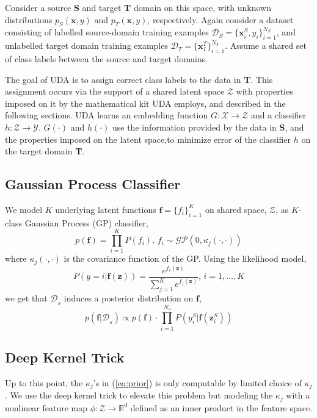 \documentclass[10pt,twocolumn,letterpaper]{article}
\newcommand{\vect}[1]{\boldsymbol{\mathbf{#1}}}
\begin{document}
Consider a source \textbf{S} and target \textbf{T} domain on this space,  with unknown distributions \(p_S(\vect{x}, y)\) and \(p_T(\vect{x},y)\), respectively.  Again consider a dataset consisting of 
labelled source-domain training examples \(\mathcal{D}_S = \{\vect{x}_i^S, y_i\}_{i=1}^{N_S}\), and unlabelled target domain training examples \(\mathcal{D}_T = \{\vect{x}_I^T\}_{i=1}^{N_T}\).  Assume a shared set of class labels between the source and target domains. 

The goal of UDA is to assign correct class labels to the data in \textbf{T}.  This assignment occurs via the support of a shared latent space \(\mathcal{Z}\) with properties imposed on it by the  mathematical kit UDA employs, and described in the following sections.  UDA learns an embedding function \(G: \mathcal{X} \to \mathcal{Z}\) and a classifier \(h: \mathcal{Z} \to \mathcal{Y}\).   \(G(\cdot)\) and \(h(\cdot)\) use the information provided by the data in \textbf{S}, and the properties imposed on the latent space,to minimize error of the classifier \(h\) on the target domain \textbf{T}.

\subsection{Gaussian Process Classifier}
We model \(K\) underlying latent functions \(\vect{f} = \{f_i\}_{i=1}^{K}\) on shared space, \(\mathcal{Z}\), as \(K\)-class Gaussian Process (GP) classifier, 
    \begin{equation} \label{eq:prior}
        p(\vect{f}) = \prod_{i=1}^{K}P(f_i), \, f_i \sim \mathcal{GP}\left(0, \kappa_j(\cdot,\cdot)\right)
    \end{equation}
where \(\kappa_j(\cdot,\cdot)\) is the covariance function of the GP. Using the likelihood model,
    \begin{equation} \label{eq:likfunc}
        P(y=i | \vect{f}(\vect{z})) = \frac{e^{f_i(\vect{z})}}{\sum_{j=1}^{K}e^{f_j(\vect{z})}}, \, i = 1,\dots,K
    \end{equation}
we get that \(\mathcal{D}_{_{S}}\) induces a posterior distribution on \(\vect{f}\),
    \begin{equation} \label{eq:targetpost}
        p(\vect{f}|\mathcal{D}_{_{S}}) \propto p(\vect{f}) \cdot \prod_{i=1}^{N_s} P(y_i^{S} | \vect{f}(\vect{z}_i^{S}))
    \end{equation}

\subsection{Deep Kernel Trick}
Up to this point, the \(\kappa_j\)'s in (\ref{eq:prior}) is only computable by limited choice of \(\kappa_j\). 
We use the deep kernel trick to elevate this problem but modeling the \(\kappa_j\) with a nonlinear feature map \(\phi: \mathcal{Z} \to \mathbb{R}^d\) defined as an inner product in the feature space.
\end{document}
